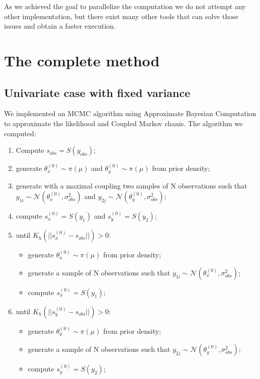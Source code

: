 \documentclass[11pt,a4paper,oneside]{report}
\begin{document}
As we achieved the goal to parallelize the computation we do not attempt any other implementation, but there exist many other tools that can solve those issues and obtain a faster execution.

 
\clearpage

\section{The complete method}

\subsection{Univariate case with fixed variance}

We implemented an MCMC algorithm using Approximate Bayesian Computation to approximate the likelihood and Coupled Markov chanis.
The algorithm we computed: 

\begin{enumerate}
	\item Compute $s_{obs} = S(y_{obs})$;
	\item generate $\theta_{x}^{(0)} \sim  \pi(\mu)$ and $\theta_{y}^{(0)} \sim  \pi(\mu)$ from prior density;
	\item generate with a maximal coupling two samples of N observations such that $y_{1i} \sim \mathcal{N}(\theta_{x}^{(0)}, \sigma_{obs} ^2)$ and  $y_{2j} \sim \mathcal{N}(\theta_{y}^{(0)}, \sigma_{obs} ^2)$;
	\item compute $s_{x}^{(0)}=S(y_{1})$ and $s_{y}^{(0)}=S(y_{2})$;
	\item until $K_h(||s_{x}^{(0)}-s_{obs}||)>0$:
	\begin{itemize}
		\item generate $\theta_{x}^{(0)} \sim  \pi(\mu)$ from prior density;
		\item generate a sample of N observations such that $y_{1i} \sim \mathcal{N}(\theta_{x}^{(0)}, \sigma_{obs} ^2)$;
		\item compute $s_{x}^{(0)}=S(y_{1})$;
	\end{itemize}
	\item until $K_h(||s_{y}^{(0)}-s_{obs}||)>0$:
	\begin{itemize}
		\item generate $\theta_{y}^{(0)} \sim  \pi(\mu)$ from prior density;
		\item generate a sample of N observations such that $y_{2j} \sim \mathcal{N}(\theta_{y}^{(0)}, \sigma_{obs} ^2)$;
		\item compute $s_{y}^{(0)}=S(y_{2})$;
	\end{itemize}
	
\end{enumerate}
\end{document}
